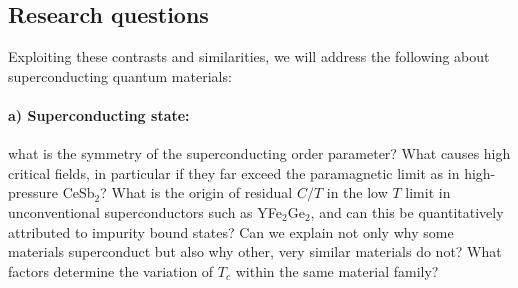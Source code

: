 \subsection*{Research questions}
\noindent



Exploiting these contrasts and similarities, we will address the following   about superconducting quantum materials:

\paragraph {a) Superconducting state:} what is the symmetry of the superconducting order parameter? What causes high critical fields, in particular if they far exceed the paramagnetic limit as in high-pressure CeSb$_2$? What is the origin of residual $C/T$ in the low $T$ limit in unconventional superconductors such as YFe$_2$Ge$_2$, and can this be quantitatively attributed to impurity bound states? 
Can we explain not only why some materials superconduct but also why other, very similar materials do not? What factors determine the variation of $T_c$ within the same material family? 


